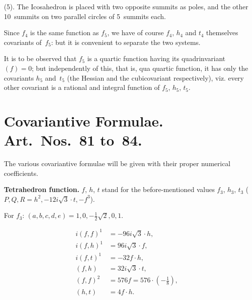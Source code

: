 \documentclass[11pt,a4paper]{book}
\begin{document}
\begin{art}
(5). The Icosahedron is placed with two opposite summits as poles, and
the other 10~summits on two parallel circles of 5~summits each.
\end{art}

\begin{art}
Since $f_4$ is the same function as $f_5$, we have of course $f_4$, $h_4$ and
$t_4$ themselves covariants of~$f_5$: but it is convenient to separate the
two systems.
\end{art}

\begin{art}
It is to be observed that $f_5$ is a quartic function having its
quadrinvariant $(f) = 0$; but independently of this, that is, qua quartic
function, it has only the covariants $h_5$ and~$t_5$ (the Hessian and the
cubicovariant respectively), viz. every other covariant is a rational and
integral function of $f_5$, $h_5$, $t_5$.
\end{art}

\section*{Covariantive Formulae. Art.~Nos.~81 to~84.}

\begin{art}
The various covariantive formulae will be given with their proper
numerical coefficients.

\textbf{Tetrahedron function.} $f$, $h$, $t$ stand for the before-mentioned
values $f_3$, $h_3$, $t_3$ ($P, Q, R = h^2, -12i\sqrt{3} \cdot t, -f^3$).

For $f_3$: $(a, b, c, d, e) = 1, 0, -\frac{1}{2}\sqrt{2}, 0, 1$.

\begin{align*}
i(f,f)^1 &= -96i\sqrt{3} \cdot h, \\
i(f,h)^1 &= 96i\sqrt{3} \cdot f, \\
i(f,t)^1 &= -32f\cdot h, \\
(f,h) &= 32i\sqrt{3} \cdot t, \\
(f,f)^2 &= 576f = 576 \cdot (-\frac{1}{8}), \\
(h,t) &= 4f\cdot h.
\end{align*}
\end{art}
\end{document}
